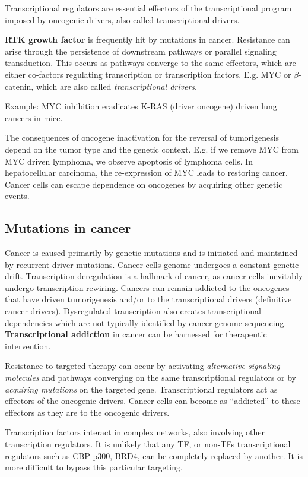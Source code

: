 Transcriptional regulators are essential effectors of the transcriptional program imposed by oncogenic drivers, also called transcriptional drivers.

\textbf{RTK growth factor} is frequently hit by mutations in cancer. Resistance can arise through the persistence of downstream pathways or parallel signaling transduction. This occurs as pathways converge to the same effectors, which are either co-factors regulating transcription or transcription factors. E.g. MYC or $\beta$-catenin, which are also called \emph{transcriptional drivers}.

Example: MYC inhibition eradicates K-RAS (driver oncogene) driven lung cancers in mice.

The consequences of oncogene inactivation for the reversal of tumorigenesis depend on the tumor type and the genetic context. E.g. if we remove MYC from MYC driven lymphoma, we observe apoptosis of lymphoma cells. In hepatocellular carcinoma, the re-expression of MYC leads to restoring cancer. Cancer cells can escape dependence on oncogenes by acquiring other genetic events.

\subsection{Mutations in cancer}

Cancer is caused primarily by genetic mutations and is initiated and maintained by recurrent driver mutations. Cancer cells genome undergoes a constant genetic drift. Transcription deregulation is a hallmark of cancer, as cancer cells inevitably undergo transcription rewiring. Cancers can remain addicted to the oncogenes that have driven tumorigenesis and/or to the transcriptional drivers (definitive cancer drivers). Dysregulated transcription also creates transcriptional dependencies which are not typically identified by cancer genome sequencing. \textbf{Transcriptional addiction} in cancer can be harnessed for therapeutic intervention.

Resistance to targeted therapy can occur by activating \emph{alternative signaling molecules} and pathways converging on the same transcriptional regulators or by \emph{acquiring mutations} on the targeted gene. Transcriptional regulators act as effectors of the oncogenic drivers. Cancer cells can become as ``addicted'' to these effectors as they are to the oncogenic drivers.

Transcription factors interact in complex networks, also involving other transcription regulators. It is unlikely that any TF, or non-TFs transcriptional regulators such as CBP-p300, BRD4, can be completely replaced by another. It is more difficult to bypass this particular targeting.

